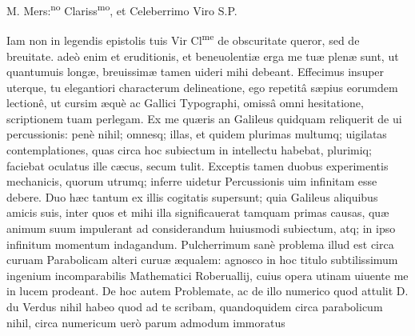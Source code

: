 \documentclass[11pt,a4paper]{article}
\begin{document}

M. Mers:\textsuperscript{no} Clariss\textsuperscript{mo}, et Celeberrimo Viro S.P.

Iam non in legendis epistolis tuis Vir Cl\textsuperscript{me} de obscuritate queror, sed de breuitate. adeò enim et eruditionis, et beneuolentiæ erga me tuæ plenæ sunt, ut quantumuis longæ, breuissimæ tamen uideri mihi debeant. Effecimus insuper uterque, tu elegantiori characterum delineatione, ego repetitâ sæpius eorumdem lectionê, ut cursim æquè ac Gallici Typographi, omissâ omni hesitatione, scriptionem tuam perlegam. Ex me quæris an Galileus quidquam reliquerit de ui percussionis: penè nihil; omnesq; illas, et quidem plurimas multumq; uigilatas contemplationes, quas circa hoc subiectum in intellectu habebat, plurimiq; faciebat oculatus ille cæcus, secum tulit. Exceptis tamen duobus experimentis mechanicis, quorum utrumq; inferre uidetur Percussionis uim infinitam esse debere. Duo hæc tantum ex  illis cogitatis supersunt; quia Galileus aliquibus amicis suis, inter quos et mihi illa significauerat tamquam primas causas, quæ animum suum impulerant ad considerandum huiusmodi subiectum, atq; in ipso infinitum momentum indagandum. Pulcherrimum sanè problema illud est circa curuam Parabolicam alteri curuæ æqualem: agnosco in hoc titulo subtilissimum ingenium incomparabilis Mathematici Roberuallij, cuius opera utinam uiuente me in lucem prodeant. De hoc autem Problemate, ac de illo numerico quod attulit D. du Verdus nihil habeo quod ad te scribam, quandoquidem circa parabolicum nihil, circa numericum uerò parum admodum immoratus
\end{document}
